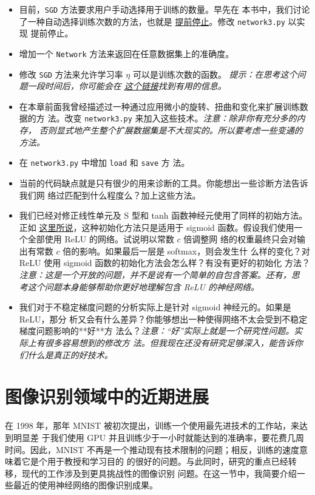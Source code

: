 \begin{itemize}
\item 目前，\lstinline!SGD! 方法要求用户手动选择用于训练\epochs{}的数量。早先在
  本书中，我们讨论了一种自动选择训练次数的方法，也就是
  \hyperref[early_stopping]{提前停止}。修改 \lstinline!network3.py! 以实现
  提前停止。
\item 增加一个 \lstinline!Network! 方法来返回在任意数据集上的准确度。
\item 修改 \lstinline!SGD! 方法来允许学习率 $\eta$ 可以是训练次数的函数。
  \emph{提示：在思考这个问题一段时间后，你可能会在%
    \href{https://groups.google.com/forum/\#!topic/theano-users/NQ9NYLvleGc}{这个链接}找到有用的信息。}
\item 在本章前面我曾经描述过一种通过应用微小的旋转、扭曲和变化来扩展训练数据的方
  法。改变 \lstinline!network3.py! 来加入这些技术。\emph{注意：除非你有充分多的内存，
  否则显式地产生整个扩展数据集是不大现实的。所以要考虑一些变通的方法。}
\item 在 \lstinline!network3.py! 中增加 \lstinline!load! 和 \lstinline!save! 方
  法。
\item 当前的代码缺点就是只有很少的用来诊断的工具。你能想出一些诊断方法告诉我们网
  络过匹配到什么程度么？加上这些方法。
\item 我们已经对修正线性单元及 S 型和 tanh 函数神经元使用了同样的初始方法。正如
  \hyperref[sec:weight_initialization]{这里所说}，这种初始化方法只是适用于
  sigmoid 函数。假设我们使用一个全部使用 ReLU 的网络。试说明以常数 $c$ 倍调整网
  络的权重最终只会对输出有常数 $c$ 倍的影响。如果最后一层是 softmax，则会发生什
  么样的变化？对 ReLU 使用 sigmoid 函数的初始化方法会怎么样？有没有更好的初始化
  方法？\emph{注意：这是一个开放的问题，并不是说有一个简单的自包含答案。还有，思
    考这个问题本身能够帮助你更好地理解包含 ReLU 的神经网络。}
\item 我们对于不稳定梯度问题的分析实际上是针对 sigmoid 神经元的。如果是 ReLU，那分
  析又会有什么差异？你能够想出一种使得网络不太会受到不稳定梯度问题影响的**好**方
  法么？\emph{注意：“好”实际上就是一个研究性问题。实际上有很多容易想到的修改方
    法。但我现在还没有研究足够深入，能告诉你们什么是真正的好技术。}
\end{itemize}

\section{图像识别领域中的近期进展}
\label{sec:recent_progress_in_image_recognition}

在 1998 年，那年 MNIST 被初次提出，训练一个使用最先进技术的工作站，来达到明显差
于我们使用 GPU 并且训练少于一小时就能达到的准确率，要花费几周时间。因此，MNIST
不再是一个推动现有技术限制的问题；相反，训练的速度意味着它是个用于教授和学习目的
的很好的问题。与此同时，研究的重点已经转移，现代的工作涉及到更具挑战性的图像识别
问题。在这一节中，我简要介绍一些最近的使用神经网络的图像识别成果。

